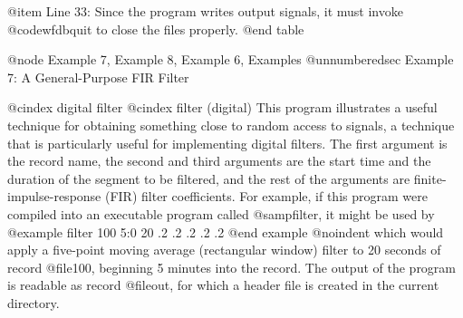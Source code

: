 {{{{{{{{{{@item Line 33:
Since the program writes output signals, it must invoke @code{wfdbquit} to
close the files properly.
@end table

@node     Example 7, Example 8, Example 6, Examples
@unnumberedsec Example 7:  A General-Purpose FIR Filter

@cindex digital filter
@cindex filter (digital)
This program illustrates a useful technique for obtaining something
close to random access to signals, a technique that is particularly
useful for implementing digital filters.  The first argument is the
record name, the second and third arguments are the start time and the
duration of the segment to be filtered, and the rest of the arguments
are finite-impulse-response (FIR) filter coefficients.  For example, if
this program were compiled into an executable program called
@samp{filter}, it might be used by
@example
filter 100 5:0 20 .2 .2 .2 .2 .2
@end example
@noindent
which would apply a five-point moving average (rectangular window) filter
to 20 seconds of record @file{100}, beginning 5 minutes into the record.
The output of the program is readable as record @file{out}, for which a
header file is created in the current directory.

}}}}}}}}}}
